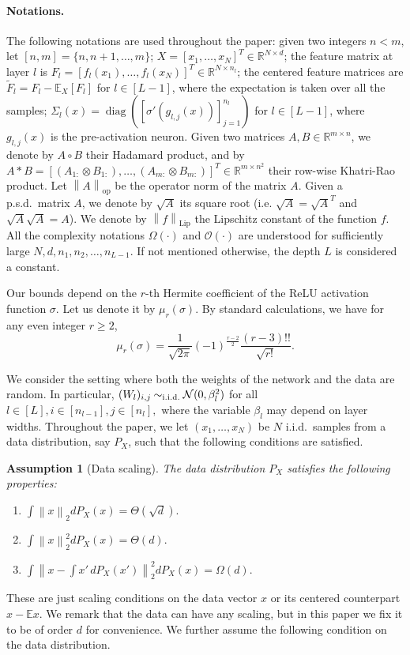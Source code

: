 \documentclass[11pt]{article}
\def\RR{\mathbb{R}}
\def\diag{\operatorname{\mathop{diag}}}
\newcommand{\E}{\mathbb{E}}
\newcommand{\distas}[1]{\mathbin{\overset{#1}{\sim}}}
\newtheorem{assumptions}[theorem]{Assumption}
\newcommand{\bigOmg}[1]{\Omega\left(#1\right)}
\newcommand{\norm}[1]{\left\|#1\right\|}
\def\Lip{\mathrm{Lip}}
\def\op{\mathrm{op}}
\begin{document}
\paragraph{Notations.} The following notations are used throughout the paper: given two integers $n<m$, let $[n, m]=\{n, n+1, \ldots, m\}$;
$X=[x_1,\ldots,x_N]^T\in\RR^{N\times d}$; the feature matrix at layer $l$ is
$F_l=[f_l(x_1),\ldots,f_l(x_N)]^T\in\RR^{N\times n_l}$; 
the centered feature matrices are $\tilde{F}_l=F_l-\E_X[F_l]$ for $l\in[L-1]$,
where the expectation is taken over all the samples; 
$\Sigma_l(x)=\diag([\sigma'(g_{l,j}(x))]_{j=1}^{n_l})$ for $l\in[L-1]$,
where $g_{l,j}(x)$ is the pre-activation neuron. Given two matrices $A,B\in\RR^{m\times n}$, we denote by $A\circ B$ their Hadamard product, 
and by $A\ast B=[(A_{1:}\otimes B_{1:}),\ldots,(A_{m:}\otimes B_{m:})]^T\in\RR^{m\times n^2}$ their row-wise Khatri-Rao product. 
Let $\norm{A}_{\op}$ be the operator norm of the matrix $A.$
Given a p.s.d.\ matrix $A$, we denote by $\sqrt{A}$ its square root (i.e. $\sqrt{A}=\sqrt{A}^T$ and $\sqrt{A}\sqrt{A}=A$).
We denote by $\norm{f}_{\Lip}$ the Lipschitz constant of the function $f$. 
All the complexity notations $\Omega(\cdot)$ and $\mathcal{O}(\cdot)$ are understood for sufficiently large $N,d,n_1,n_2,\ldots,n_{L-1}$. 
If not mentioned otherwise, the depth $L$ is considered a constant.


Our bounds depend on the $r$-th Hermite coefficient of the ReLU activation function $\sigma$.
Let us denote it by $\mu_r(\sigma).$
By standard calculations, we have for any even integer $r\geq 2$, 
\begin{equation}\label{eq:HermiteReLU}
    \mu_r(\sigma) = \frac{1}{\sqrt{2\pi}} (-1)^{\frac{r-2}{2}}\frac{(r-3)!!}{\sqrt{r!}}.
\end{equation}


 We consider the setting where both the weights of the network and the data are random.
In particular, $(W_l)_{i,j}\distas{}_{\rm i.i.d.}\mathcal{N}(0,\beta_l^2)$ for all $l\in[L], i\in[n_{l-1}], j\in[n_l],$
where the variable $\beta_l$ may depend on layer widths. 
Throughout the paper, we let $(x_1,\ldots,x_N)$ be $N$ i.i.d.\ samples from a data distribution, say $P_X$, such that the following conditions are satisfied.

\begin{assumptions}[Data scaling]\label{ass:data_dist}
 The data distribution $P_X$ satisfies the following properties:
    \begin{enumerate}
	\item $\int \norm{x}_2 dP_X(x)=\Theta(\sqrt{d}).$
	\item $\int \norm{x}_2^2 dP_X(x)=\Theta(d).$
	\item $\int \norm{x-\int x'\, dP_X(x')}_2^2 dP_X(x)=\bigOmg{d}.$
    \end{enumerate}
\end{assumptions}
These are just scaling conditions on the data vector $x$ or its centered counterpart $x-\E x$. 
We remark that the data can have any scaling, but in this paper we fix it to be of order $d$ for convenience.
We further assume the following condition on the data distribution.
\end{document}
